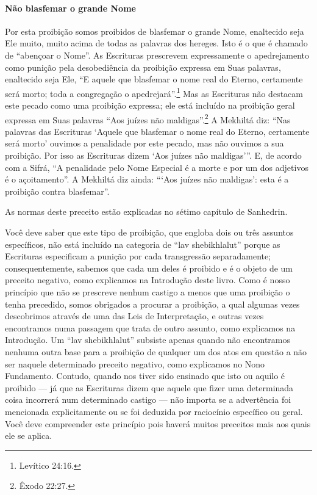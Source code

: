 \paragraph{Não blasfemar o grande Nome}

Por esta proibição somos proibidos de blasfemar o grande Nome,
enaltecido seja Ele muito, muito acima de todas as palavras dos hereges.
Isto é o que é chamado de ``abençoar o Nome''. As Escrituras prescrevem
expressamente o apedrejamento como punição pela desobediência da
proibição expressa em Suas palavras, enaltecido seja Ele, ``E aquele que
blasfemar o nome real do Eterno, certamente será morto; toda a
congregação o apedrejará''.\footnote{Levítico 24:16.} Mas as Escrituras não
destacam este pecado como uma proibição expressa; ele está incluído na proibição geral expressa em Suas palavras
``Aos juízes não maldigas''.\footnote{Êxodo 22:27.} A Mekhiltá diz: ``Nas
palavras das Escrituras `Aquele que blasfemar o nome real do Eterno,
certamente será morto' ouvimos a penalidade por este pecado, mas não
ouvimos a sua proibição. Por isso as Escrituras dizem `Aos juízes não
maldigas'''. E, de acordo com a Sifrá, ``A penalidade pelo Nome Especial
é a morte e por um dos adjetivos é o açoitamento''. A Mekhiltá diz
ainda: ```Aos juízes não maldigas': esta é a proibição contra
blasfemar''.

As normas deste preceito estão explicadas no sétimo capítulo de Sanhedrin.

Você deve saber que este tipo de proibição, que engloba dois ou três
assuntos específicos, não está incluído na categoria de ``lav
shebikhlalut'' porque as Escrituras especificam a punição por cada
transgressão separadamente; consequentemente, sabemos que cada um deles
é proibido e é o objeto de um preceito negativo, como explicamos na
Introdução deste livro. Como é nosso princípio que não se prescreve
nenhum castigo a menos que uma proibição o tenha precedido, somos
obrigados a procurar a proibição, a qual algumas vezes descobrimos
através de uma das Leis de Interpretação, e outras vezes encontramos
numa passagem que trata de outro assunto, como explicamos na
Introdução. Um ``lav shebikhlalut'' subsiste apenas quando não
encontramos nenhuma outra base para a proibição de qualquer um dos atos
em questão a não ser naquele determinado preceito negativo, como
explicamos no Nono Fundamento. Contudo, quando nos tiver sido ensinado
que isto ou aquilo é proibido --- já que as Escrituras dizem que aquele
que fizer uma determinada coisa incorrerá num determinado castigo ---
não importa se a advertência foi mencionada explicitamente ou se foi
deduzida por raciocínio específico ou geral. Você deve compreender este
princípio pois haverá muitos preceitos mais aos quais ele se aplica.

